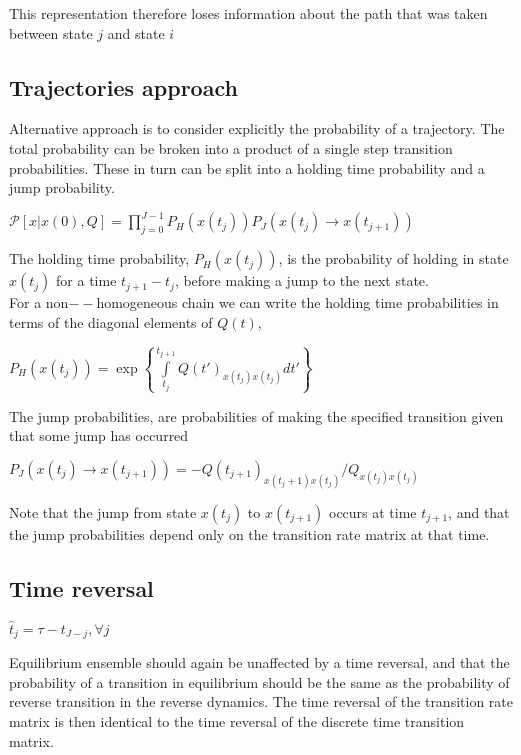 \documentclass{article}
\begin{document}
This representation therefore loses information about the path that was taken between state \(j\) and state \(i\)

\subsection*{Trajectories approach}

Alternative approach is to consider explicitly the probability of a trajectory. The total probability can be broken into a product of a single step
transition probabilities. These in turn can be split into a holding time probability and a jump probability.

\(\mathcal{P}[x|x(0),Q]=\prod _{j=0}^{J-1} P_H\left(x\left(t_j\right)\right)P_J\left(x\left(t_j\right)\to x\left(t_{j+1}\right)\right)\)

The holding time probability, \(P_H\left(x\left(t_j\right)\right)\), is the probability of holding in state \(x\left(t_j\right)\) for a time \(t_{j+1}-t_j\),
before making a jump to the next state.\\
For a non$--$homogeneous chain we can write the holding time probabilities in terms of the diagonal elements of \(Q(t)\),

\(P_H\left(x\left(t_j\right)\right)=\exp \left\{\underset{t_j}{\overset{t_{j+1}}{\int }}Q\left(t'\right)_{x\left(t_j\right)x\left(t_j\right)}dt'\right\}\)

The jump probabilities, are probabilities of making the specified transition given that some jump has occurred

\(P_J\left(x\left(t_j\right)\to x\left(t_{j+1}\right)\right)=-Q\left(t_{j+1}\right)_{x\left(t_j+1\right)x\left(t_j\right)}/Q_{x\left(t_j\right)x\left(t_j\right)}\)

Note that the jump from state \(x\left(t_j\right)\) to \(x\left(t_{j+1}\right)\) occurs at time \(t_{j+1}\), and that the jump probabilities depend
only on the transition rate matrix at that time.

\subsection*{Time reversal}

\(\hat{t}_j=\tau -t_{J-j}, \forall j\)

Equilibrium ensemble should again be unaffected by a time reversal, and that the probability of a transition in equilibrium should be the same as
the probability of reverse transition in the reverse dynamics. The time reversal of the transition rate matrix is then identical to the time reversal
of the discrete time transition matrix.
\end{document}

